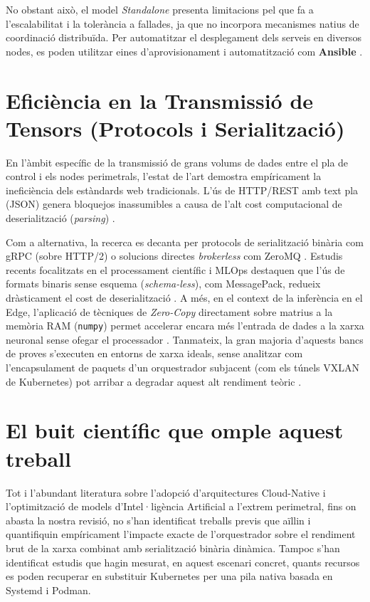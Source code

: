 No obstant això, el model \textit{Standalone} presenta limitacions pel que fa a l'escalabilitat i la tolerància a fallades, ja que no incorpora mecanismes natius de coordinació distribuïda. 
Per automatitzar el desplegament dels serveis en diversos nodes, es poden utilitzar eines d'aprovisionament i automatització com \textbf{Ansible} \cite{carson2025selfhealing}.

\section{Eficiència en la Transmissió de Tensors (Protocols i Serialització)}
En l'àmbit específic de la transmissió de grans volums de dades entre el pla de control i els nodes perimetrals, l'estat de l'art demostra empíricament la ineficiència dels estàndards web tradicionals. 
L'ús de HTTP/REST amb text pla (JSON) genera bloquejos inassumibles a causa de l'alt cost computacional de deserialització (\textit{parsing}) \cite{tusa2021impact}. 

Com a alternativa, la recerca es decanta per protocols de serialització binària com gRPC (sobre HTTP/2) o solucions directes \textit{brokerless} com ZeroMQ \cite{sarasola2024iiot}. 
Estudis recents focalitzats en el processament científic i MLOps destaquen que l'ús de formats binaris sense esquema (\textit{schema-less}), com MessagePack, redueix dràsticament el cost de deserialització \cite{kumar2026evaluating}. 
A més, en el context de la inferència en el Edge, l'aplicació de tècniques de \textit{Zero-Copy} directament sobre matrius a la memòria RAM (\texttt{numpy}) permet accelerar encara més l'entrada de dades a la xarxa neuronal sense ofegar el processador \cite{yi2025modelmap}. 
Tanmateix, la gran majoria d'aquests bancs de proves s'executen en entorns de xarxa ideals, sense analitzar com l'encapsulament de paquets d'un orquestrador subjacent (com els túnels VXLAN de Kubernetes) pot arribar a degradar aquest alt rendiment teòric \cite{santos2025comprehensive}.

\section{El buit científic que omple aquest treball}
Tot i l'abundant literatura sobre l'adopció d'arquitectures Cloud-Native i l'optimització de models d'Intel·ligència Artificial a l'extrem perimetral, fins on abasta la nostra revisió, no s'han identificat treballs previs que aïllin i quantifiquin empíricament l'impacte exacte de l'orquestrador sobre el rendiment brut de la xarxa combinat amb serialització binària dinàmica. Tampoc s'han identificat estudis que hagin mesurat, en aquest escenari concret, quants recursos es poden recuperar en substituir Kubernetes per una pila nativa basada en Systemd i Podman.

